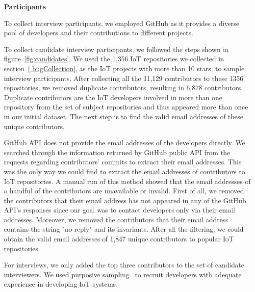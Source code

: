 \textbf{Participants} 

To collect interview participants, we employed GitHub as it provides a diverse pool of developers and their contributions to different projects.

To collect candidate interview participants, we followed the steps shown in figure~\autoref{fig:candidates}. We used the 1,356 IoT repositories we collected in section~\autoref{ bugCollection}, as the IoT projects with more than 10 stars, to sample interview participants. After collecting all the 11,129 contributors to these 1356 repositories, we removed duplicate contributors, resulting in 6,878 contributors. Duplicate contributors are the IoT developers involved in more than one repository from the set of subject repositories and thus appeared more than once in our initial dataset. The next step is to find the valid email addresses of these unique contributors.


GitHub API does not provide the email addresses of the developers directly. We searched through the information returned by GitHub public API from the requests regarding contributors' commits to extract their email addresses. This was the only way we could find to extract the email addresses of contributors to IoT repositories.  A manual run of this method showed that the email addresses of a handful of the contributors are unavailable or invalid. First of all, we removed the contributors that their email address has not appeared in any of the GitHub API's responses since our goal was to contact developers only via their email addresses. Moreover, we removed the contributors that their email address contains the string "no-reply" and its invariants. After all the filtering, we could obtain the valid email addresses of 1,847 unique contributors to popular IoT repositories.

For interviews, we only added the top three contributors to the set of candidate interviewers. We used purposive sampling~\cite{sampling2007} to recruit developers with adequate experience in developing IoT systems.  

